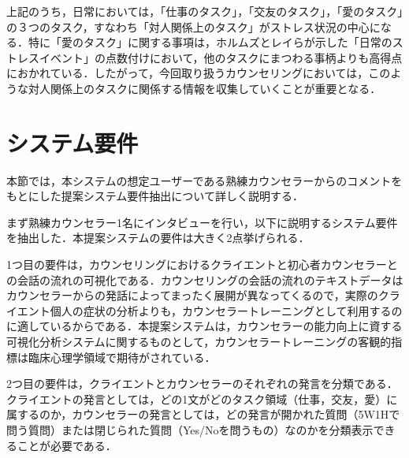 \documentclass[shuuron]{kuee}
\begin{document}
上記のうち，日常においては，「仕事のタスク」，「交友のタスク」，「愛のタスク」の３つのタスク，すなわち「対人関係上のタスク」がストレス状況の中心になる．特に「愛のタスク」に関する事項は，ホルムズとレイら\cite{holmes1967social}が示した「日常のストレスイベント」の点数付けにおいて，他のタスクにまつわる事柄よりも高得点におかれている．したがって，今回取り扱うカウンセリングにおいては，このような対人関係上のタスクに関係する情報を収集していくことが重要となる．

\section{システム要件}%

本節では，本システムの想定ユーザーである熟練カウンセラーからのコメントをもとにした提案システム要件抽出について詳しく説明する．


まず熟練カウンセラー1名にインタビューを行い，以下に説明するシステム要件を抽出した．本提案システムの要件は大きく2点挙げられる．

1つ目の要件は，カウンセリングにおけるクライエントと初心者カウンセラーとの会話の流れの可視化である．カウンセリングの会話の流れのテキストデータはカウンセラーからの発話によってまったく展開が異なってくるので，実際のクライエント個人の症状の分析よりも，カウンセラートレーニングとして利用するのに適しているからである．本提案システムは，カウンセラーの能力向上に資する可視化分析システムに関するものとして，カウンセラートレーニングの客観的指標は臨床心理学領域で期待がされている．

2つ目の要件は，クライエントとカウンセラーのそれぞれの発言を分類である．クライエントの発言としては，どの1文がどのタスク領域（仕事，交友，愛）に属するのか，カウンセラーの発言としては，どの発言が開かれた質問（5W1Hで問う質問）または閉じられた質問（Yes/Noを問うもの）なのかを分類表示できることが必要である．





%
\end{document}
